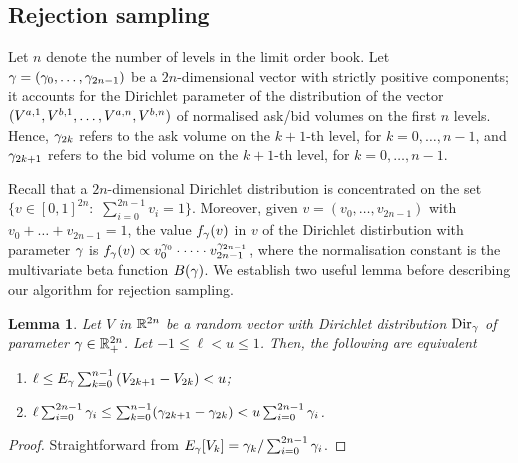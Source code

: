 \documentclass[10pt, article,table]{article}
\newtheorem{lemma}[thm]{Lemma}
\begin{document}
\subsection{Rejection sampling}\label{sec.pipest.rejection_sampling}
Let $n$ denote the number of levels in the limit order book. Let $\dirparam=(\dirparam_{0},\dots,\dirparam_{2n-1})$ be a $2n$-dimensional vector with strictly positive components; it accounts for the Dirichlet parameter of the distribution of the vector $(\nthBestAskVolume[1],\nthBestBidVolume[1],\dots, \nthBestAskVolume[n],\nthBestBidVolume[n])$ of normalised ask/bid volumes on the first $n$ levels. Hence, $\dirparam_{2k}$ refers to the ask volume on the $k+1$-th level, for $k=0,\dots,n-1$, and 
$\dirparam_{2k+1}$ refers to the bid volume on the $k+1$-th level, for $k=0,\dots,n-1$. 

Recall that a $2n$-dimensional Dirichlet distribution is concentrated on the set $\lbrace v \in [0,1]^{2n}: \, \, \sum_{i=0}^{2n-1} v_i = 1 \rbrace$. Moreover, given $v=(v_0, \dots,v_{2n-1})$ with  $v_0 + \dots + v_{2n-1} = 1$, the value $\dirichletDensity(v)$ in $v$  of the Dirichlet distirbution with parameter $\dirparam$ is $\dirichletDensity(v) \propto v_{0}^{\dirparam_{0}} \cdot \dots \cdot v_{2n-1}^{\dirparam_{2n-1}}$, where  the normalisation constant is the multivariate beta function $B(\dirparam)$.
We establish two useful lemma before describing our algorithm for rejection sampling. 

\begin{lemma}\label{lemma.equivalence_expected_constraint}
 Let $V$ in $\R^{2n}$ be a random vector with Dirichlet distribution $\text{Dir}_{\dirparam}$ of parameter $\dirparam \in \R^{2n}_{+}$. Let  $-1\leq \ell < u \leq 1$. Then, the following are equivalent 
 \begin{enumerate}[label={\roman{*}.} , ref={\ref{lemma.equivalence_expected_constraint}.\roman{*}}]
  \item \label{lemma.equivalence_expected_constraint.expectation}$
  \ell \leq \Expectation_{\dirparam} \sum_{k=0}^{n-1} \left( V_{2k+1} - V_{2k} \right) < u $;
  \item \label{lemma.equivalence_expected_constraint.parameter} $\ell \sum_{i=0}^{2n-1}\dirparam_i 
  \leq 
  \sum_{k=0}^{n-1} (\dirparam_{2k+1} - \dirparam_{2k} ) 
  < u \sum_{i=0}^{2n-1}\dirparam_i
  $.
 \end{enumerate}
\end{lemma}
\begin{proof}
 Straightforward from $\Expectation_{\dirparam}[V_{k}] = \dirparam_{k}/\sum_{i=0}^{2n-1} \dirparam_{i}$.
\end{proof}
\end{document}
